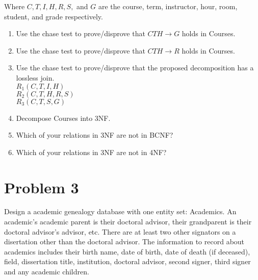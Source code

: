 \documentclass{article}
\begin{document}
Where $C, T, I, H, R, S,$ and $G$ are the course, term, instructor, hour, room, student, and grade respectively. \\

\begin{enumerate}[label=\alph*.]
\item Use the chase test to prove/disprove that  $CTH\rightarrow G$ holds in Courses.\\
{\bf  } \clearpage
\item Use the chase test to prove/disprove that  $CTH\rightarrow R$ holds in Courses.\\
{\bf  } \clearpage
\item Use the chase test to prove/disprove that the proposed decomposition has a lossless join.\\
$R_1(C, T, I, H)$\\
$R_2(C, T, H, R, S)$\\
$R_3(C, T, S, G)$\\
{\bf  } \clearpage
\item Decompose Courses into 3NF.\\
{\bf  } \clearpage
\item Which of your relations in 3NF are not in BCNF?\\
{\bf  } \clearpage
\item Which of your relations in 3NF are not in 4NF?\\
{\bf  } \clearpage
\end{enumerate}

\section*{Problem 3}
Design a academic genealogy database with one entity set: Academics. An academic's
academic parent is their doctoral advisor, their grandparent is their doctoral
advisor's advisor, etc. There are at least two other signators on a disertation
other than the doctoral advisor. The information to record about academics 
includes their birth name, date of birth, date of death (if deceased), field, 
dissertation title, institution, doctoral advisor, second signer, third signer
and any academic children.\\
{\bf  } \clearpage 
\end{document}

